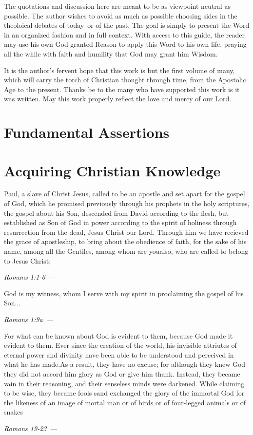 \documentclass[10pt]{article}
\let\oldquote\quote
\let\endoldquote\endquote
\renewenvironment{quote}[2][]
  {\if\relax\detokenize{#1}\relax
     \def\quoteauthor{#2}%
   \else
     \def\quoteauthor{#2~---~#1}%
   \fi
   \oldquote}
  {\par\nobreak\smallskip\hfill\textit{\quoteauthor}%
   \endoldquote\addvspace{\bigskipamount}}
\begin{document}
The quotations and discussion here are meant to be as viewpoint neutral as possible. The author wishes to avoid as much as possible choosing sides in the theoloical debates of today--or of the past. The goal is simply to present the Word in an organized fashion and in full context. With access to this guide, the reader may use his own God-granted Reason to apply this Word to his own life, praying all the while with faith and humility that God may grant him Wisdom.

It is the author's fervent hope that this work is but the first volume of many, which will carry the torch of Christian thought through time, from the Apostolic Age to the present. Thanks be to the many who have supported this work is it was written. May this work properly reflect the love and mercy of our Lord. 

\section*{Fundamental Assertions}

\section*{Acquiring Christian Knowledge}

\begin{quote}{Romans 1:1-6}
Paul, a slave of Christ Jesus, called to be an apostle and set apart for the gospel of God, which he promised previously through his prophets in the holy scriptures, the gospel about his Son, descended from David according to the flesh, but established as Son of God in power according to the spirit of holiness through resurrection from the dead, Jesus Christ our Lord. Through him we have recieved the grace of apostleship, to bring about the obedience of faith, for the sake of his name, among all the Gentiles, among whom are youalso, who are called to belong to Jesus Christ;
\end{quote}

\begin{quote}{Romans 1:9a}
God is my witness, whom I serve with my spirit in proclaiming the gospel of his Son...
\end{quote}

\begin{quote}{Romans 19-23}
For what can be known about God is evident to them, because God made it evident to them. Ever since the creation of the world, his invisible attriutes of eternal power and divinity have been able to be understood and perceived in what he has made.As a result, they have no excuse; for although they knew God they did not accord him glory as God or give him thank. Instead, they became vain in their reasoning, and their senseless minds were darkened. While claiming to be wise, they became fools sand exchanged the glory of the immortal God for the likeness of an image of mortal man or of birds or of four-legged animals or of snakes
\end{quote} 
\end{document}
